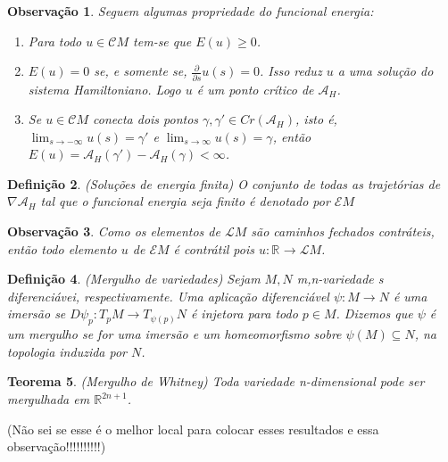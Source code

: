 \documentclass[12pt]{book}
\newtheorem{teorema}{Teorema}[section]
\newtheorem{definicao}[teorema]{Definição}
\newtheorem{observacao}[teorema]{Observação}
\newcommand{\derivadaparcial}[2]{\frac{\partial #1}{\partial #2}}
\newcommand{\energiafinitaM}{\mathcal{E}M}
\newcommand{\funcionalH}{\mathcal{A}_{H}}
\newcommand{\gradientefuncional}{\nabla \funcionalH}
\newcommand{\pontoscriticos}[1]{\textit{Cr}(#1)}
\newcommand{\real}[1]{\mathbb{R}^{#1}}
\newcommand{\reta}{\real{}}
\newcommand{\lacocontrateis}{\mathcal{L}M}
\newcommand{\cilindrosLM}{\mathcal{C}M}
\newcommand{\vermelho}[1]{{\color{red}#1}}
\begin{document}
	\begin{observacao}
		Seguem algumas propriedade do funcional energia:
		
		\begin{enumerate}
			\item Para todo $u \in \cilindrosLM$ tem-se que $E(u)\geq 0$.
			
			\item $E(u) = 0$ se, e somente se, $\derivadaparcial{}{s}u(s) = 0$. Isso reduz $u$ a uma solução do sistema Hamiltoniano. Logo $u$ é um ponto crítico de $\funcionalH$.
			
			\item Se $u \in \cilindrosLM$ conecta dois pontos $\gamma, \gamma' \in \pontoscriticos{\funcionalH}$, isto é, $\lim_{s\to -\infty}u(s)=\gamma'$ e $\lim_{s\to \infty}u(s)=\gamma$, então $E(u)=\funcionalH(\gamma') - \funcionalH(\gamma)<\infty$.
		\end{enumerate}
		
	\end{observacao}
	
 	\begin{definicao}
 		(Soluções de energia finita) O conjunto de todas as trajetórias de $\gradientefuncional$ tal que o funcional energia seja finito é denotado por $\energiafinitaM$ 
 	\end{definicao}
 	
 	\begin{observacao}
 		Como os elementos de $\lacocontrateis$ são caminhos fechados contráteis, então todo elemento $u$ de $\energiafinitaM$ é contrátil pois $u:\reta\to \lacocontrateis$.
 	\end{observacao}
 	
 	
 	\begin{definicao}\label{definicao_mergulho_variedades}
 		(Mergulho de variedades) Sejam $M, N$ m,n-variedade s diferenciávei, respectivamente. Uma aplicação diferenciável $\psi:M\to N$ é uma imersão se $D\psi_{p}:T_{p}M\to T_{\psi(p)}N$ é injetora para todo $p \in M$. Dizemos que $\psi$ é um mergulho se for uma imersão e um homeomorfismo sobre $\psi(M) \subseteq N$, na topologia induzida por $N$. 
 	\end{definicao}
 	
 	\begin{teorema}\label{teorema_whitney}
 		(Mergulho de Whitney) Toda variedade n-dimensional pode ser mergulhada em $\real{2n+1}$.
 	\end{teorema}
 	\vermelho{(Não sei se esse é o melhor local para colocar esses resultados e essa observação!!!!!!!!!!)}
 	
\end{document}
